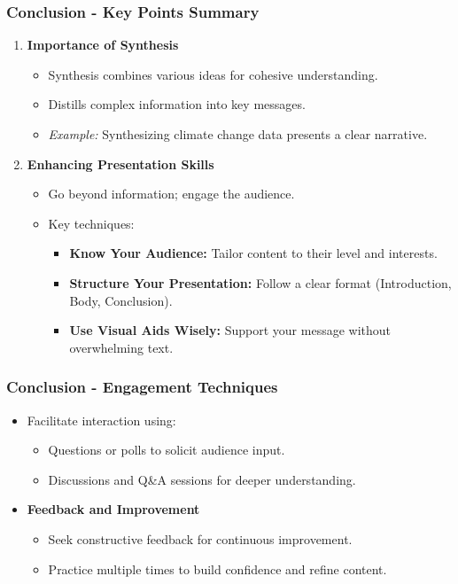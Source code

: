\documentclass[aspectratio=169]{beamer}
\begin{document}
\begin{frame}[fragile]
    \frametitle{Conclusion - Key Points Summary}
    \begin{enumerate}
        \item \textbf{Importance of Synthesis}
        \begin{itemize}
            \item Synthesis combines various ideas for cohesive understanding.
            \item Distills complex information into key messages.
            \item \textit{Example:} Synthesizing climate change data presents a clear narrative.
        \end{itemize}

        \item \textbf{Enhancing Presentation Skills}
        \begin{itemize}
            \item Go beyond information; engage the audience.
            \item Key techniques:
            \begin{itemize}
                \item \textbf{Know Your Audience:} Tailor content to their level and interests.
                \item \textbf{Structure Your Presentation:} Follow a clear format (Introduction, Body, Conclusion).
                \item \textbf{Use Visual Aids Wisely:} Support your message without overwhelming text.
            \end{itemize}
        \end{itemize}
    \end{enumerate}
\end{frame}

\begin{frame}[fragile]
    \frametitle{Conclusion - Engagement Techniques}
    \begin{itemize}
        \item Facilitate interaction using:
        \begin{itemize}
            \item Questions or polls to solicit audience input.
            \item Discussions and Q\&A sessions for deeper understanding.
        \end{itemize}

        \item \textbf{Feedback and Improvement}
        \begin{itemize}
            \item Seek constructive feedback for continuous improvement.
            \item Practice multiple times to build confidence and refine content.
        \end{itemize}
    \end{itemize}
\end{frame}
\end{document}
